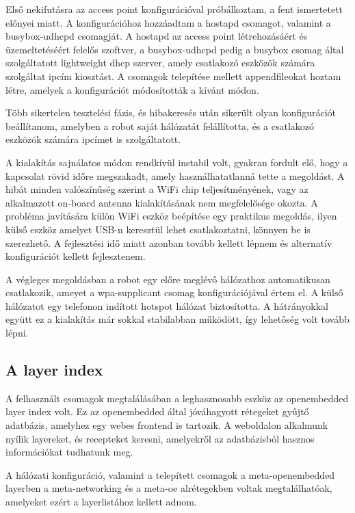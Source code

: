 \medskip

Első nekifutásra az access point konfigurációval próbálkoztam, a fent ismertetett
előnyei miatt. A konfigurációhoz hozzáadtam a hostapd csomagot, valamint a
busybox-udhcpd csomagját. A hostapd az access point létrehozásáért és
üzemeltetéséért felelős szoftver, a busybox-udhcpd pedig a busybox csomag által
szolgáltatott lightweight dhcp szerver, amely csatlakozó eszközök
számára szolgáltat ipcím kiosztást. A csomagok telepítése mellett appendfileokat
hoztam létre, amelyek a konfigurációt módosították a kívánt módon.

Több sikertelen tesztelési fázis, és hibakeresés után sikerült olyan
konfigurációt beállítanom, amelyben a robot saját hálózatát felállította, és a
csatlakozó eszközök számára ipcímet is szolgáltatott.

A kialakítás sajnálatos
módon rendkívül instabil volt, gyakran fordult elő, hogy a kapcsolat rövid időre
megszakadt, amely használhatatlanná tette a megoldást. A hibát minden
valószínűség szerint a WiFi chip teljesítményének, vagy az alkalmazott on-board
antenna kialakításának nem megfelelősége okozta. A probléma javítására külön WiFi
eszköz beépítése egy praktikus megoldás, ilyen külső eszköz amelyet USB-n
keresztül lehet csatlakoztatni, könnyen be is szerezhető. A fejlesztési idő miatt
azonban tovább kellett lépnem és alternatív konfigurációt kellett fejlesztenem.

\medskip

A végleges megoldásban a robot egy előre meglévő hálózathoz automatikusan
csatlakozik, ameyet a wpa-supplicant csomag konfigurációjával értem el. A külső
hálózatot egy telefonon indított hotspot hálózat biztosította. A hátrányokkal
együtt ez a kialakítás már sokkal stabilabban működött, így lehetőség volt tovább
lépni.

\medskip

\subsection{A layer index}

A felhasznált csomagok megtalálásában a leghasznosabb eszköz az
openembedded layer index volt. Ez az openembedded által jóváhagyott rétegeket
gyűjtő adatbázis, amelyhez egy webes frontend is tartozik. A weboldalon alkalmunk
nyílik layereket, és recepteket keresni, amelyekről az adatbázisból hasznos
információkat tudhatunk meg.

A hálózati konfiguráció, valamint a telepített csomagok a meta-openembedded
layerben a meta-networking és a meta-oe alrétegekben voltak megtalálhatóak,
amelyeket ezért a layerlistához kellett adnom.


